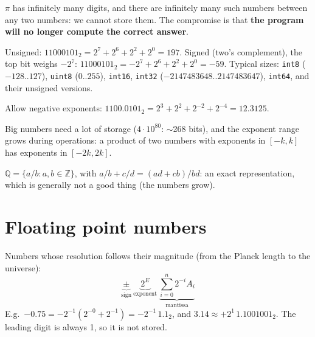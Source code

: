 \documentclass[11pt,a4paper,openany]{book}
\begin{document}
\begin{keybox}[title=The compromise]
$\pi$ has infinitely many digits, and there are infinitely many such numbers between any two
numbers: we cannot store them. The compromise is that \textbf{the program will no longer
compute the correct answer}.
\end{keybox}

\begin{defnbox}[title=Integers]
Unsigned: $11000101_2 = 2^7 + 2^6 + 2^2 + 2^0 = 197$. Signed (two's complement), the top bit
weighs $-2^7$: $11000101_2 = -2^7 + 2^6 + 2^2 + 2^0 = -59$. Typical sizes: \texttt{int8}
($-128..127$), \texttt{uint8} ($0..255$), \texttt{int16}, \texttt{int32}
($-2147483648..2147483647$), \texttt{int64}, and their unsigned versions.
\end{defnbox}

\begin{defnbox}[title=Fixed point arithmetic]
Allow negative exponents: $1100.0101_2 = 2^3 + 2^2 + 2^{-2} + 2^{-4} = 12.3125$.
\end{defnbox}

\begin{warnbox}[title=Drawbacks of fixed point]
Big numbers need a lot of storage ($4 \cdot 10^{80}$: $\sim$268 bits), and the exponent range
grows during operations: a product of two numbers with exponents in $[-k, k]$ has exponents in
$[-2k, 2k]$.
\end{warnbox}

\begin{defnbox}[title=Rational numbers]
$\mathbb{Q} = \{a/b : a, b \in \mathbb{Z}\}$, with $a/b + c/d = (ad + cb)/bd$: an exact
representation, which is generally not a good thing (the numbers grow).
\end{defnbox}


\section{Floating point numbers}

\begin{defnbox}[title=Floating point number]
Numbers whose resolution follows their magnitude (from the Planck length to the universe):
\[
\underbrace{\pm}_{\text{sign}} \ \underbrace{2^E}_{\text{exponent}}
\ \underbrace{\sum_{i=0}^{n} 2^{-i} A_i}_{\text{mantissa}}
\]
E.g.\ $-0.75 = -2^{-1}(2^{-0} + 2^{-1}) = -2^{-1}\,1.1_2$, and
$3.14 \approx +2^1\,1.1001001_2$. The leading digit is always 1, so it is not stored.
\end{defnbox}
\end{document}
